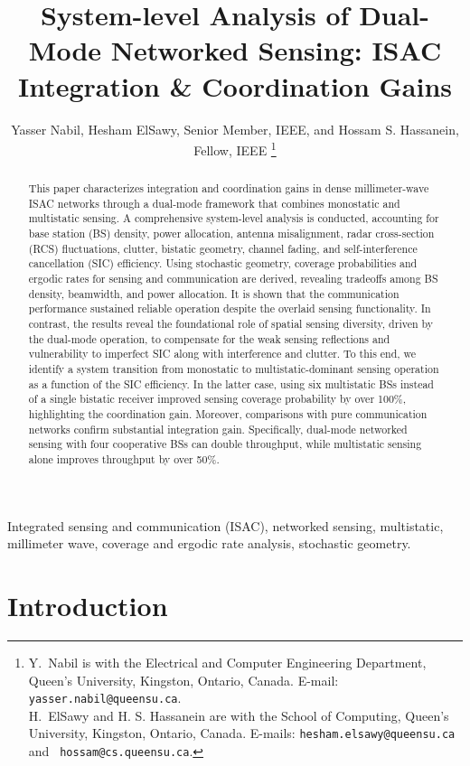 \documentclass[journal]{IEEEtran}
\title{System-level Analysis of Dual-Mode Networked Sensing: ISAC Integration \& Coordination Gains}
\author{Yasser Nabil, Hesham ElSawy, Senior Member, IEEE, and Hossam S. Hassanein, Fellow, IEEE
\thanks{Y.\ Nabil is with the Electrical and Computer Engineering Department, Queen’s University, Kingston, Ontario, Canada. E-mail: \texttt{yasser.nabil@queensu.ca}.\\
H.\ ElSawy and H. S.  Hassanein are with the School of Computing, Queen's University, Kingston, Ontario, Canada. E-mails: \texttt{hesham.elsawy@queensu.ca} and \texttt{ hossam@cs.queensu.ca}.}}
\begin{document}
\maketitle
\begin{abstract}
This paper characterizes integration and coordination gains in dense millimeter-wave ISAC networks through a dual-mode framework that combines monostatic and multistatic sensing. A comprehensive system-level analysis is conducted, accounting for base station (BS) density, power allocation, antenna misalignment, radar cross-section (RCS) fluctuations, clutter, bistatic geometry, channel fading, and self-interference cancellation (SIC) efficiency.
Using stochastic geometry, coverage probabilities and ergodic rates for sensing and communication are derived, revealing tradeoffs among BS density, beamwidth, and power allocation. It is shown that the communication performance sustained reliable operation despite the overlaid sensing functionality. In contrast, the results reveal the foundational role of spatial sensing diversity, driven by the dual-mode operation, to compensate for the weak sensing reflections and vulnerability to imperfect SIC along with interference and clutter. To this end, we identify a system transition from monostatic to multistatic-dominant sensing operation as a function of the SIC efficiency. In the latter case, using six multistatic BSs instead of a single bistatic receiver improved sensing coverage probability by over 100\%, highlighting the coordination gain.  Moreover, comparisons with pure communication networks confirm substantial integration gain. Specifically, dual-mode networked sensing with four cooperative BSs can double throughput, while multistatic sensing alone improves throughput by over 50\%.
\end{abstract}












\begin{IEEEkeywords}
Integrated sensing and communication (ISAC), networked sensing, multistatic, millimeter wave, coverage and ergodic rate analysis, stochastic geometry.
\end{IEEEkeywords}

\IEEEpeerreviewmaketitle


\section{Introduction}
\end{document}
